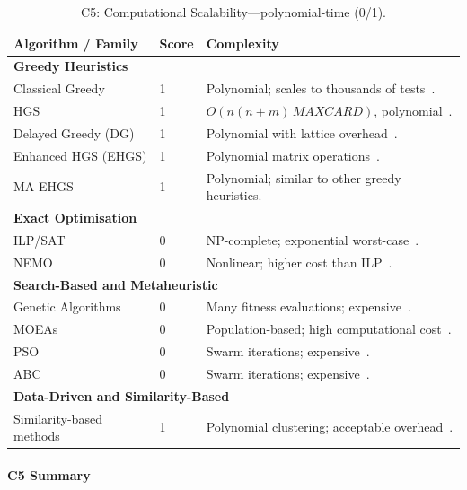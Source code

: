 \begin{appendices}
\begin{table}[H]
  \centering
  \footnotesize
  \caption{C5: Computational Scalability—polynomial-time (0/1).}
  \label{tab:app-c5}
  \begin{tabular}{@{}p{4.5cm}p{0.8cm}p{6.9cm}@{}}
    \toprule
    \textbf{Algorithm / Family} & \textbf{Score} & \textbf{Complexity} \\
    \midrule
    \multicolumn{3}{l}{\textbf{Greedy Heuristics}} \\
    Classical Greedy & 1 & Polynomial; scales to thousands of tests~\cite{yoo2012}. \\
    HGS & 1 & $O(n(n+m)\,\mathit{MAXCARD})$, polynomial~\cite{harrold1993}. \\
    Delayed Greedy (DG) & 1 & Polynomial with lattice overhead~\cite{tallam2005}. \\
    Enhanced HGS (EHGS) & 1 & Polynomial matrix operations~\cite{gladston2015}. \\
    MA-EHGS & 1 & Polynomial; similar to other greedy heuristics. \\[0.2em]
    \multicolumn{3}{l}{\textbf{Exact Optimisation}} \\
    ILP/SAT & 0 & NP-complete; exponential worst-case~\cite{garey1979}. \\
    NEMO & 0 & Nonlinear; higher cost than ILP~\cite{lin2018}. \\[0.2em]
    \multicolumn{3}{l}{\textbf{Search-Based and Metaheuristic}} \\
    Genetic Algorithms & 0 & Many fitness evaluations; expensive~\cite{yoo2012}. \\
    MOEAs & 0 & Population-based; high computational cost~\cite{wei2017}. \\
    PSO & 0 & Swarm iterations; expensive~\cite{ahuja2024}. \\
    ABC & 0 & Swarm iterations; expensive~\cite{ahuja2024}. \\[0.2em]
    \multicolumn{3}{l}{\textbf{Data-Driven and Similarity-Based}} \\
    Similarity-based methods & 1 & Polynomial clustering; acceptable overhead~\cite{bach2017}. \\
    \bottomrule
  \end{tabular}
\end{table}

\paragraph*{C5 Summary}


\end{appendices}
